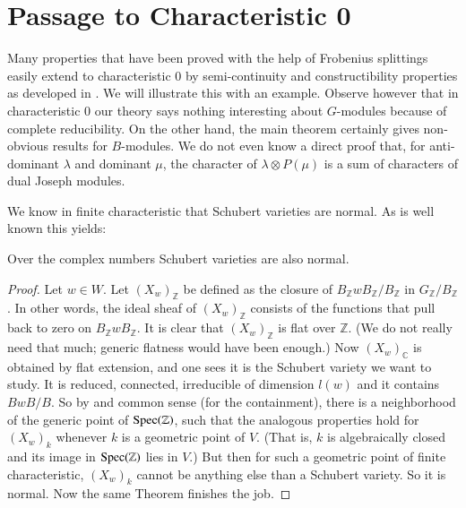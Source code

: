 \section{Passage to Characteristic
  0}\label{chap7-sec7.3}\pageoriginale

Many\label{page74} properties that have been proved with the help of Frobenius
splittings easily extend to characteristic $0$ by semi-continuity and
constructi\-bility properties as developed in \cite{key6}. We will
illustrate this with an example. Observe however that in
characteristic $0$ our theory says nothing interesting about
$G$-modules because of complete reducibility. On the other hand, the
main theorem certainly gives non-obvious results for $B$-modules. We
do not even know a direct proof that, for anti-dominant $\lambda$ and
dominant $\mu$, the character of $\lambda\otimes P(\mu)$ is a sum of
characters of dual Joseph modules.

We know in finite characteristic that Schubert varieties are
normal. As is well known this yields:

\begin{lemma}\label{chap7-lem7.3.1}
Over the complex numbers Schubert varieties are also normal.
\end{lemma}

\begin{proof}
Let $w\in W$. Let $(X_{w})_{\mathbb{Z}}$ be defined as the closure of
$B_{\mathbb{Z}}wB_{\mathbb{Z}}/B_{\mathbb{Z}}$ in
$G_{\mathbb{Z}}/B_{\mathbb{Z}}$. In other words, the ideal sheaf of
$(X_{w})_{\mathbb{Z}}$ consists of the functions that pull back to
zero on $B_{\mathbb{Z}}wB_{\mathbb{Z}}$. It is clear that
$(X_{w})_{\mathbb{Z}}$ is flat over $\mathbb{Z}$. (We do not really
need that much; generic flatness would have been enough.) Now
$(X_{w})_{\mathbb{C}}$ is obtained by flat extension, and one sees it
is the Schubert variety we want to study. It is reduced, connected,
irreducible of dimension $l(w)$ and it contains $BwB/B$. So by
\cite[9.2.6.2, 12.2.4]{key6} and common sense (for the containment),
there is a neighborhood of the generic point of $\operatorname{Spec} (\mathbb{Z})$,
such that the analogous properties hold for $(X_{w})_{k}$ whenever $k$
is a geometric point of $V$. (That is, $k$ is algebraically closed and
its image in $\operatorname{Spec}(\mathbb{Z})$ lies in $V$.) But then for such a
geometric point of finite characteristic, $(X_{w})_{k}$ cannot be
anything else than a Schubert variety. So it is normal. Now the same
Theorem \cite[12.2.4]{key6} finishes the job.
\end{proof}

